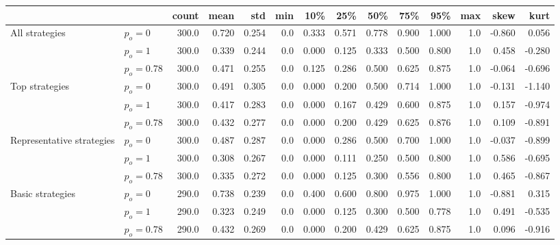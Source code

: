 \begin{tabular}{llrrrrrrrrrrrr}
\toprule
                 &            &  count &   mean &    std &  min &    10\% &    25\% &    50\% &    75\% &    95\% &  max &   skew &   kurt \\
\midrule
\rowcolor{Gray}
All strategies & $p_o=0$ &  300.0 &  0.720 &  0.254 &  0.0 &  0.333 &  0.571 &  0.778 &  0.900 &  1.000 &  1.0 & -0.860 &  0.056 \\
\rowcolor{Gray}
                 & $p_o=1$ &  300.0 &  0.339 &  0.244 &  0.0 &  0.000 &  0.125 &  0.333 &  0.500 &  0.800 &  1.0 &  0.458 & -0.280 \\
\rowcolor{Gray}
                 & $p_o=0.78$ &  300.0 &  0.471 &  0.255 &  0.0 &  0.125 &  0.286 &  0.500 &  0.625 &  0.875 &  1.0 & -0.064 & -0.696 \\
                 \midrule
Top strategies & $p_o=0$ &  300.0 &  0.491 &  0.305 &  0.0 &  0.000 &  0.200 &  0.500 &  0.714 &  1.000 &  1.0 & -0.131 & -1.140 \\
                 & $p_o=1$ &  300.0 &  0.417 &  0.283 &  0.0 &  0.000 &  0.167 &  0.429 &  0.600 &  0.875 &  1.0 &  0.157 & -0.974 \\
                 & $p_o=0.78$ &  300.0 &  0.432 &  0.277 &  0.0 &  0.000 &  0.200 &  0.429 &  0.625 &  0.876 &  1.0 &  0.109 & -0.891 \\
                 \midrule
\rowcolor{Gray}
Representative strategies & $p_o=0$ &  300.0 &  0.487 &  0.287 &  0.0 &  0.000 &  0.286 &  0.500 &  0.700 &  1.000 &  1.0 & -0.037 & -0.899 \\
\rowcolor{Gray}
                 & $p_o=1$ &  300.0 &  0.308 &  0.267 &  0.0 &  0.000 &  0.111 &  0.250 &  0.500 &  0.800 &  1.0 &  0.586 & -0.695 \\
\rowcolor{Gray}
                 & $p_o=0.78$ &  300.0 &  0.335 &  0.272 &  0.0 &  0.000 &  0.125 &  0.300 &  0.556 &  0.800 &  1.0 &  0.465 & -0.867 \\
                 \midrule
Basic strategies & $p_o=0$ &  290.0 &  0.738 &  0.239 &  0.0 &  0.400 &  0.600 &  0.800 &  0.975 &  1.000 &  1.0 & -0.881 &  0.315 \\
                 & $p_o=1$ &  290.0 &  0.323 &  0.249 &  0.0 &  0.000 &  0.125 &  0.300 &  0.500 &  0.778 &  1.0 &  0.491 & -0.535 \\
                 & $p_o=0.78$ &  290.0 &  0.432 &  0.269 &  0.0 &  0.000 &  0.200 &  0.429 &  0.625 &  0.875 &  1.0 &  0.096 & -0.916 \\
\bottomrule
\end{tabular}
